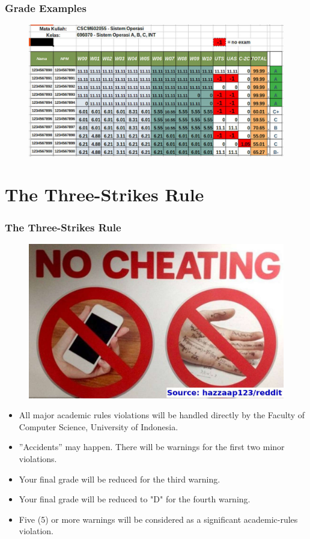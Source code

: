 \documentclass[aspectratio=169, xcolor=table, notheorems, hyperref={pdfpagelabels=false}]{beamer}
\begin{document}
\begin{frame}[fragile]
\frametitle{Grade Examples}

\begin{figure}
\includegraphics[width=0.94\linewidth]{os-siak}
\end{figure}

\end{frame}

\section{The Three-Strikes Rule}
\begin{frame}[fragile]
\frametitle{The Three-Strikes Rule}

\begin{figure}
\includegraphics[width=0.30\linewidth]{os-cheating}
\end{figure}

\begin{itemize}
\item All major academic rules violations will be handled directly by the Faculty of Computer Science,
University of Indonesia.
\item ''Accidents'' may happen. There will be warnings for the first two minor violations.
\item Your final grade will be reduced for the third warning.
\item Your final grade will be reduced to "D" for the fourth warning.
\item Five (5) or more warnings will be considered as a significant academic-rules violation.
\end{itemize}

\end{frame}
\end{document}
